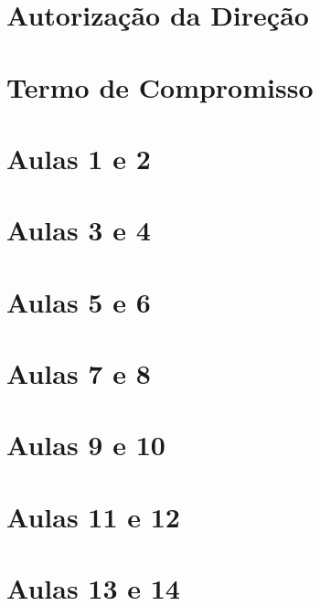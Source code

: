

\begin{apendicesenv}

    \partapendices

    \chapter{Autorização da Direção} \label{ApendiceA.1} 
    \chapter{Termo de Compromisso} \label{ApendiceA.2} 
    \chapter{Aulas 1 e 2} \label{ApendiceB} 
    \chapter{Aulas 3 e 4} \label{ApendiceC} 
    \chapter{Aulas 5 e 6} \label{ApendiceD} 
    \chapter{Aulas 7 e 8} \label{ApendiceE} 
    \chapter{Aulas 9 e 10} \label{ApendiceF} 
    \chapter{Aulas 11 e 12} \label{ApendiceG} 
    \chapter{Aulas 13 e 14} \label{ApendiceH} 

\end{apendicesenv}
